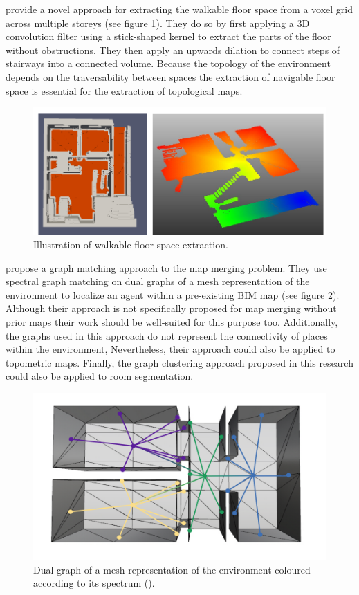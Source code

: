 \citet{gorte_navigation_2019} provide a novel approach for extracting the walkable floor space from a voxel grid across multiple storeys (see figure \ref{fig:gorte}). They do so by first applying a 3D convolution filter using a stick-shaped kernel to extract the parts of the floor without obstructions. They then apply an upwards dilation to connect steps of stairways into a connected volume. Because the topology of the environment depends on the traversability between spaces the extraction of navigable floor space is essential for the extraction of topological maps.

\begin{figure}[h]
    \centering
    \includegraphics*[width=.7\textwidth]{./fig/gorte.png}
    \caption{Illustration of walkable floor space extraction\citep{gorte_navigation_2019}.}
    \label{fig:gorte}
\end{figure}

\citet{bot_graph-matching_2019} propose a graph matching approach to the map merging problem. They use spectral graph matching on dual graphs of a mesh representation of the environment to localize an agent within a pre-existing BIM map (see figure \ref{fig:bot}). Although their approach is not specifically proposed for map merging without prior maps their work should be well-suited for this purpose too. Additionally, the graphs used in this approach do not represent the connectivity of places within the environment, Nevertheless, their approach could also be applied to topometric maps. Finally, the graph clustering approach proposed in this research could also be applied to room segmentation.

\begin{figure}[h]
    \centering
    \includegraphics*[width=.7\textwidth]{./fig/fanny_bot_graph.png}
    \caption{Dual graph of a mesh representation of the environment coloured according to its spectrum (\citep{bot_graph-matching_2019}).}
    \label{fig:bot}
\end{figure}

